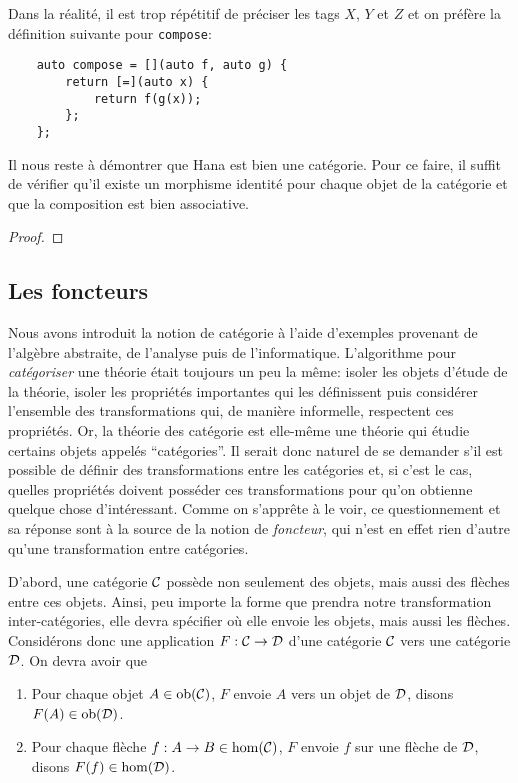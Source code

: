 Dans la réalité, il est trop répétitif de préciser les tags $X$, $Y$ et $Z$
et on préfère la définition suivante pour {\tt compose}:
\begin{verbatim}
    auto compose = [](auto f, auto g) {
        return [=](auto x) {
            return f(g(x));
        };
    };
\end{verbatim}

Il nous reste à démontrer que Hana est bien une catégorie. Pour ce faire, il
suffit de vérifier qu'il existe un morphisme identité pour chaque objet de
la catégorie et que la composition est bien associative.

\begin{proof}

\end{proof}


\subsection{Les foncteurs}
Nous avons introduit la notion de catégorie à l'aide d'exemples provenant de
l'algèbre abstraite, de l'analyse puis de l'informatique. L'algorithme pour
\textit{catégoriser} une théorie était toujours un peu la même: isoler les
objets d'étude de la théorie, isoler les propriétés importantes qui les
définissent puis considérer l'ensemble des transformations qui, de manière
informelle, respectent ces propriétés. Or, la théorie des catégorie est
elle-même une théorie qui étudie certains objets appelés ``catégories''.
Il serait donc naturel de se demander s'il est possible de définir des
transformations entre les catégories et, si c'est le cas, quelles propriétés
doivent posséder ces transformations pour qu'on obtienne quelque chose
d'intéressant. Comme on s'apprête à le voir, ce questionnement et sa
réponse sont à la source de la notion de \textit{foncteur}, qui n'est
en effet rien d'autre qu'une transformation entre catégories.

D'abord, une catégorie $\mathcal{C}$ possède non seulement des objets, mais aussi
des flèches entre ces objets. Ainsi, peu importe la forme que prendra notre
transformation inter-catégories, elle devra spécifier où elle envoie les
objets, mais aussi les flèches. Considérons donc une application $F : \mathcal{C} \to \mathcal{D}$
d'une catégorie $\mathcal{C}$ vers une catégorie $\mathcal{D}$. On devra avoir que
\begin{enumerate}
    \item Pour chaque objet $A \in \mathrm{ob}(\mathcal{C})$, $F$ envoie $A$ vers un objet de
          $\mathcal{D}$, disons $F(A) \in \mathrm{ob}(\mathcal{D})$.
    \item Pour chaque flèche $f : A \to B \in \hom(\mathcal{C})$, $F$ envoie $f$ sur
          une flèche de $\mathcal{D}$, disons $F(f) \in \hom(\mathcal{D})$.
\end{enumerate}

